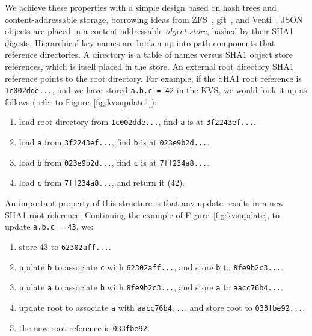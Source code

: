 We achieve these properties with a simple design based on hash trees
and content-addressable storage, borrowing ideas from
ZFS~\cite{Bonwick03thezettabyte}, git~\cite{Chacon:2009:PG:1618548}, and
Venti~\cite{Quinlan:2002:VNA:645371.651321}.
JSON objects are placed in a content-addressable
{\em object store}, hashed by their SHA1 digests.
Hierarchical key names are broken up into path components that reference
directories.
A directory is a table of names versus SHA1 object store references,
which is itself placed in the store.  An external root directory SHA1
reference points to the root directory.
For example, if the SHA1 root reference is {\tt 1c002dde...}, and we have
stored {\tt a.b.c = 42} in the KVS, we would look it up as follows
(refer to Figure~\ref{fig:kvsupdate1}):
\begin{enumerate}
\item{load root directory from {\tt 1c002dde...}, find {\tt a} is at
{\tt 3f2243ef...}.}
\item{load {\tt a} from {\tt 3f2243ef...}, find {\tt b} is at
{\tt 023e9b2d...}.}
\item{load {\tt b} from {\tt 023e9b2d...}, find {\tt c} is at
{\tt 7ff234a8...}.}
\item{load {\tt c} from {\tt 7ff234a8...}, and return it (42).}
\end{enumerate}

An important property of this structure is that any update results
in a new SHA1 root reference.  Continuing the example
of Figure~\ref{fig:kvsupdate}, to update {\tt a.b.c = 43}, we:
\begin{enumerate}
\item{store 43 to {\tt 62302aff...}.}
\item{update {\tt b} to associate {\tt c} with {\tt 62302aff...}, and store {\tt b} to {\tt 8fe9b2c3...}.}
\item{update {\tt a} to associate {\tt b} with {\tt 8fe9b2c3...}, and store {\tt a} to {\tt aacc76b4...}.}
\item{update root to associate {\tt a} with {\tt aacc76b4...}, and store root to {\tt 033fbe92...}.}
\item{the new root reference is {\tt 033fbe92}.}
\end{enumerate}

